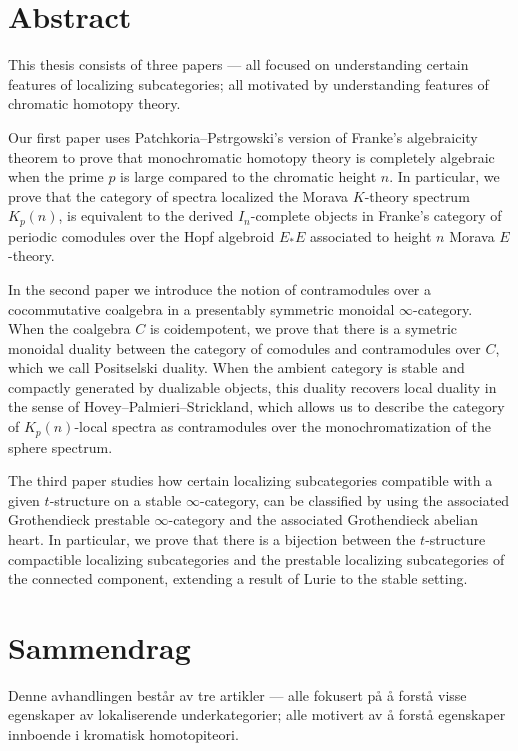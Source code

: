 

\section*{Abstract}

This thesis consists of three papers --- all focused on understanding certain features of localizing subcategories; all motivated by understanding features of chromatic homotopy theory. 

Our first paper uses Patchkoria--Pstr\a{}gowski's version of Franke's algebraicity theorem to prove that monochromatic homotopy theory is completely algebraic when the prime $p$ is large compared to the chromatic height $n$. In particular, we prove that the category of spectra localized the Morava $K$-theory spectrum $K_p(n)$, is equivalent to the derived $I_n$-complete objects in Franke's category of periodic comodules over the Hopf algebroid $E_*E$ associated to height $n$ Morava $E$-theory. 

In the second paper we introduce the notion of contramodules over a cocommutative coalgebra in a presentably symmetric monoidal $\infty$-category. When the coalgebra $C$ is coidempotent, we prove that there is a symetric monoidal duality between the category of comodules and contramodules over $C$, which we call Positselski duality. When the ambient category is stable and compactly generated by dualizable objects, this duality recovers local duality in the sense of Hovey--Palmieri--Strickland, which allows us to describe the category of $K_p(n)$-local spectra as contramodules over the monochromatization of the sphere spectrum. 

The third paper studies how certain localizing subcategories compatible with a given $t$-structure on a stable $\infty$-category, can be classified by using the associated Grothendieck prestable $\infty$-category and the associated Grothendieck abelian heart. In particular, we prove that there is a bijection between the $t$-structure compactible localizing subcategories and the prestable localizing subcategories of the connected component, extending a result of Lurie to the stable setting. 


\newpage 
\section*{Sammendrag}

Denne avhandlingen består av tre artikler --- alle fokusert på å forstå visse egenskaper av lokaliserende underkategorier; alle motivert av å forstå egenskaper innboende i kromatisk homotopiteori. 

